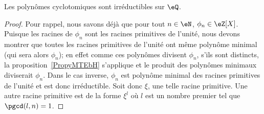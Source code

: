 \begin{proposition}      \label{PropoIeOVh}
	Les polynômes cyclotomiques sont irréductibles sur \( \eQ\).
\end{proposition}

\begin{proof}
	Pour rappel, nous savons déjà que pour tout \( n\in\eN\), \( \phi_n\in \eZ[X]\). Puisque les racines de \( \phi_n\) sont les racines primitives de l'unité, nous devons montrer que toutes les racines primitives de l'unité ont même polynôme minimal (qui sera alors \( \phi_n\)); en effet comme ces polynômes divisent \( \phi_n\), s'ils sont distincts, la proposition~\ref{PropyMTEbH} s'applique et le produit des polynômes minimaux diviserait \( \phi_n\). Dans le cas inverse, \( \phi_n\) est polynôme minimal des racines primitives de l'unité et est donc irréductible. Soit donc \( \xi\), une telle racine primitive. Une autre racine primitive est de la forme \( \xi^l\) où \( l\) est un nombre premier tel que \( \pgcd(l,n)=1\).


\end{proof}
